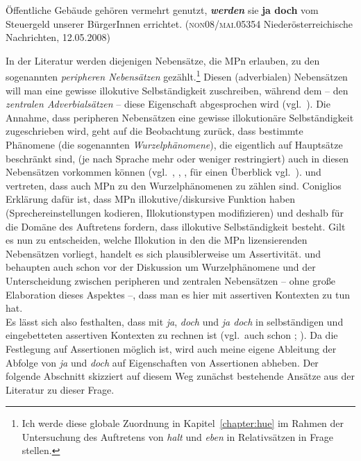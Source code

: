 \begin{exe}
	\ex\label{375} 

	Öffentliche Gebäude gehören vermehrt genutzt, \textbf{\textit{werden}} sie \textbf{ja doch} vom Steuergeld unserer Bür\-gerInnen errichtet. 	
	\newline\hbox{}\hfill{(\textsc{non08/mai.05354} Niederösterreichische Nachrichten, 12.05.2008)}
\end{exe}
In der Literatur werden diejenigen Nebensätze, die MPn erlauben, zu den sogenannten \textit{peripheren Nebensätzen} gezählt.\footnote{Ich werde diese globale Zuordnung in Kapitel~\ref{chapter:hue} im Rahmen der Untersuchung des Auftretens von \textit{halt} und \textit{eben} in Relativsätzen in Frage stellen.} Diesen (adverbialen) Nebensätzen will man eine gewisse illokutive Selbständigkeit zuschreiben, während dem   -- den \textit{zentralen Adverbialsätzen} -- diese Eigenschaft abgesprochen wird (vgl.\ \citealt{Haegeman2002, Haegeman2004, Haegeman2006}). Die Annahme, dass peripheren Nebensätzen eine gewisse illokutionäre Selbständigkeit zugeschrieben wird, geht auf die Beobachtung zurück, dass bestimmte Phänomene (die sogenannten  \textit{Wurzelphänomene}), die eigentlich auf Hauptsätze beschränkt sind, (je nach Sprache mehr oder weniger restringiert) auch in diesen Nebensätzen vorkommen können (vgl.\ \citealt{Emonds1969}, \citealt{Rutherford1970}, \citealt{Hooper1973}, für einen Überblick vgl.\ \citealt{Heycock2005}). \citet{Coniglio2011} und \citet{Abraham2012} vertreten, dass auch MPn zu den Wurzelphänomenen zu zählen sind. Coniglios Erklärung dafür ist, dass MPn illokutive/diskursive Funktion haben (Sprechereinstellungen kodieren, Illokuti\-onstypen modifizieren) und deshalb für die Domäne des Auftretens fordern, dass illokutive Selbständigkeit besteht. Gilt es nun zu entscheiden, welche Illokution in den die MPn lizensierenden Nebensätzen vorliegt, handelt es sich plausiblerweise um Assertivität. \citet[120]{Doherty1987} und \citet[93]{Kwon2005} behaupten auch schon vor der Diskussion um Wurzelphänomene und der Unterscheidung zwischen peripheren und zentralen Nebensätzen -- ohne große Elaboration dieses Aspektes --, dass man es hier mit assertiven Kontexten zu tun hat.\\

\noindent
Es lässt sich also festhalten, dass mit \textit{ja}, \textit{doch} und \textit{ja doch} in selbständigen und eingebetteten assertiven Kontexten zu rechnen ist (vgl.\ auch schon \citealt[167--170]{Mueller2014a}; \citeyear[205--207]{Mueller2017b}). Da die Festlegung auf Assertionen möglich ist, wird auch meine eigene Ableitung der Abfolge von \textit{ja} und \textit{doch} auf Eigenschaften von Assertionen abheben. Der folgende Abschnitt skizziert auf diesem Weg zunächst bestehende Ansätze aus der Literatur zu dieser Frage. 

